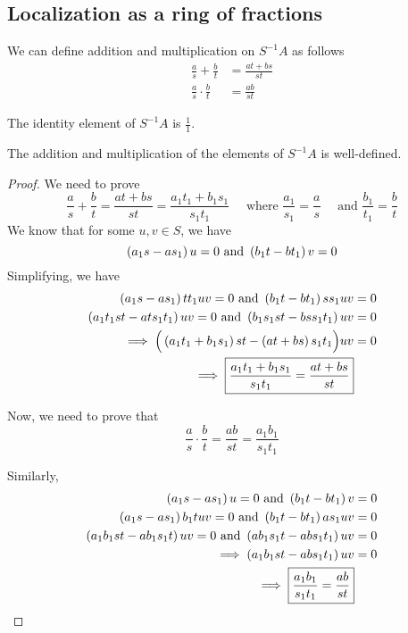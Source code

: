 \subsection{Localization as a ring of fractions}

We can define addition and multiplication on \(S^{-1}A\) as follows
\begin{align*}
	\frac{a}{s} + \frac{b}{t} & = \frac{at + bs}{st} \\
	\frac{a}{s} \cdot \frac{b}{t} & = \frac{ab}{st}
\end{align*}

The identity element of \(S^{-1}A\) is \(\frac{1}{1}\).

\begin{claim}{}{}
	The addition and multiplication
	of the elements of \(S^{-1} A\) is well-defined.
\end{claim}

\begin{proof}
	We need to prove
	\[
		\frac{a}{s} + \frac{b}{t} = \frac{at + bs}{st}
		=\frac{a_1 t_1 + b_1 s_1}{s_1 t_1}
		\quad \text{ where } \frac{a_1}{s_1} = \frac{a}{s}
		\quad \text{ and } \frac{b_1}{t_1} = \frac{b}{t}
	\]
	We know that for some \(u, v \in S\), we have
	\[
		\left( a_1 s - a s_1 \right)u = 0 \text{ and }
		\left( b_1 t - b t_1 \right)v = 0
	\]
	Simplifying, we have
	\begin{align*}
		\left( a_1 s - a s_1 \right) t t_1 u v = 0
		\text{ and } \left( b_1 t - b t_1 \right) s s_1 u v &= 0 \\
		\left( a_1 t_1 s t - a t s_1 t_1 \right) u v = 0
		\text{ and } \left( b_1 s_1 s t - b s s_1 t_1 \right) u v &= 0 \\
		\implies \Big{(}  \left( a_1 t_1 + b_1 s_1 \right) st -
		\left( a t + b s \right) s_1 t_1 \Big{)} uv &= 0 \\
		\implies \boxed{
			\frac{a_1 t_1 + b_1 s_1}{s_1 t_1} = \frac{a t + b s}{s t}
		}
	\end{align*}

	Now, we need to prove that
	\[
		\frac{a}{s} \cdot \frac{b}{t} = \frac{ab}{st}
		= \frac{a_1 b_1}{s_1 t_1}
	\]

	Similarly,
	\begin{align*}
		\left( a_1 s - a s_1 \right)u = 0 \text{ and }
		\left( b_1 t - b t_1 \right)v &= 0 \\
		\left( a_1 s - a s_1 \right) b_1 t u v = 0 \text{ and }
		\left( b_1 t - b t_1 \right) a s_1 u v &= 0 \\
		\left( a_1 b_1 s t - a b_1  s_1 t \right) u v = 0 \text{ and }
		\left( a b_1 s_1 t - a b s_1 t_1 \right) u v &= 0 \\
		\implies \left( a_1 b_1 st - a b s_1 t_1 \right) uv &= 0 \\
		\implies \boxed{
			\frac{a_1 b_1}{s_1 t_1} = \frac{ab}{st}
		}
	\end{align*}
\end{proof}


